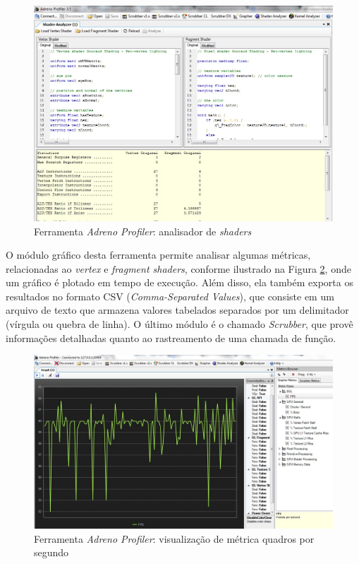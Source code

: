 	\begin{figure}[ht]
	\centering
		\includegraphics[keepaspectratio=true,scale=0.4]{figuras/shader_analyzer.jpg}
	\caption{Ferramenta \textit{Adreno Profiler}: analisador de \textit{shaders}}
	\label{adrenoProfiler}
	\end{figure}

	O módulo gráfico desta ferramenta permite analisar algumas métricas, relacionadas ao \textit{vertex} e \textit{fragment shaders}, conforme ilustrado na Figura \ref{graph}, onde um gráfico é plotado em tempo de execução. Além disso, ela também exporta os resultados no formato CSV (\textit{Comma-Separated Values}), que consiste em um arquivo de texto que armazena valores tabelados separados por um delimitador (vírgula ou quebra de linha). O último módulo é o chamado \textit{Scrubber}, que provê informações detalhadas quanto ao rastreamento de uma chamada de função. 

	\begin{figure}[ht]
	\centering
		\includegraphics[keepaspectratio=true,scale=0.35]{figuras/graph.jpg}
	\caption{Ferramenta \textit{Adreno Profiler}: visualização de métrica quadros por segundo}
	\label{graph}
	\end{figure}

